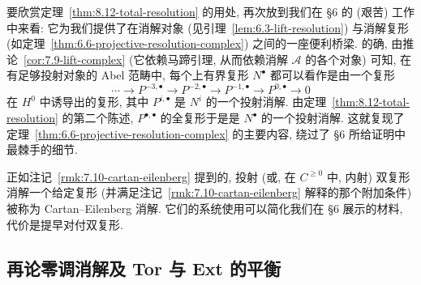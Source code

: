 要欣赏定理~\ref{thm:8.12-total-resolution} 的用处, 再次放到我们在 §6 的 (艰苦) 工作中来看: 它为我们提供了在消解对象 (见引理~\ref{lem:6.3-lift-resolution}) 与消解复形 (如定理~\ref{thm:6.6-projective-resolution-complex}) 之间的一座便利桥梁. 的确, 由推论~\ref{cor:7.9-lift-complex} (它依赖马蹄引理, 从而依赖消解 $\mathcal{A}$ 的各个对象) 可知, 在有足够投射对象的 Abel 范畴中, 每个上有界复形 $N^\bullet$ 都可以看作是由一个复形
\[
\cdots \longrightarrow P^{-3,\bullet} \longrightarrow P^{-2,\bullet} \longrightarrow P^{-1,\bullet} \longrightarrow P^{0,\bullet} \longrightarrow 0
\]
在 $H^0$ 中诱导出的复形, 其中 $P^{i,\bullet}$ 是 $N^i$ 的一个投射消解. 由定理~\ref{thm:8.12-total-resolution} 的第二个陈述, $P^{\bullet,\bullet}$ 的全复形于是是 $N^\bullet$ 的一个投射消解. 这就复现了定理~\ref{thm:6.6-projective-resolution-complex} 的主要内容, 绕过了 §6 所给证明中最棘手的细节.

正如注记~\ref{rmk:7.10-cartan-eilenberg} 提到的, 投射 (或, 在 $C^{\ge 0}$ 中, 内射) 双复形消解一个给定复形 (并满足注记~\ref{rmk:7.10-cartan-eilenberg} 解释的那个附加条件) 被称为 Cartan--Eilenberg 消解. 它们的系统使用可以简化我们在 §6 展示的材料, 代价是提早对付双复形.

\subsection{再论零调消解及 Tor 与 Ext 的平衡}
\label{subsec:8.5-balancing}

